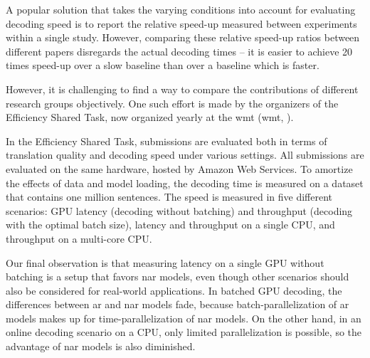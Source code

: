 A popular solution that takes the varying conditions into account for
evaluating decoding speed is to report the relative speed-up measured between
experiments within a single study. However, comparing these relative speed-up
ratios between different papers disregards the actual decoding times -- it is
easier to achieve 20 times speed-up over a slow baseline than over a baseline
which is faster.

However, it is challenging to find a way to compare the contributions of
different research groups objectively. One such effort is made by the
organizers of the Efficiency Shared Task, now organized yearly at the \acl{wmt}
(\acs{wmt}, \citealp{heafield-etal-2020-findings,
  heafield-etal-2021-findings}).

In the Efficiency Shared Task, submissions are evaluated both in terms of
translation quality and decoding speed under various settings. All submissions
are evaluated on the same hardware, hosted by Amazon Web Services.  To amortize
the effects of data and model loading, the decoding time is measured on a
dataset that contains one million sentences. The speed is measured in five
different scenarios: GPU latency (decoding without batching) and throughput
(decoding with the optimal batch size), latency and throughput on a single CPU,
and throughput on a multi-core CPU. 



Our final observation is that measuring latency on a single GPU without
batching is a setup that favors \ac{nar} models, even though other scenarios
should also be considered for real-world applications. In batched GPU decoding,
the differences between \ac{ar} and \ac{nar} models fade, because
batch-parallelization of \ac{ar} models makes up for time-parallelization of
\ac{nar} models. On the other hand, in an online decoding scenario on a CPU,
only limited parallelization is possible, so the advantage of \ac{nar} models
is also diminished. 



